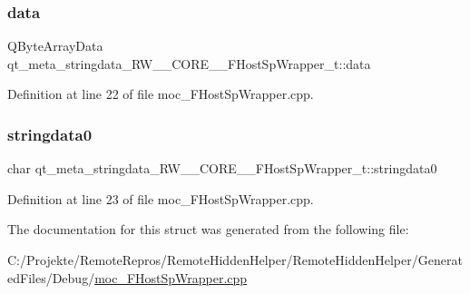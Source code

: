\subsubsection{\texorpdfstring{data}{data}}
{\footnotesize\ttfamily Q\+Byte\+Array\+Data qt\+\_\+meta\+\_\+stringdata\+\_\+\+R\+W\+\_\+\+\_\+\+C\+O\+R\+E\+\_\+\+\_\+\+F\+Host\+Sp\+Wrapper\+\_\+t\+::data}



Definition at line 22 of file moc\+\_\+\+F\+Host\+Sp\+Wrapper.\+cpp.

\hypertarget{structqt__meta__stringdata___r_w_____c_o_r_e_____f_host_sp_wrapper__t_a9d1313b4195bca5e48e5fba152725df4}{}\label{structqt__meta__stringdata___r_w_____c_o_r_e_____f_host_sp_wrapper__t_a9d1313b4195bca5e48e5fba152725df4} 
\subsubsection{\texorpdfstring{stringdata0}{stringdata0}}
{\footnotesize\ttfamily char qt\+\_\+meta\+\_\+stringdata\+\_\+\+R\+W\+\_\+\+\_\+\+C\+O\+R\+E\+\_\+\+\_\+\+F\+Host\+Sp\+Wrapper\+\_\+t\+::stringdata0}



Definition at line 23 of file moc\+\_\+\+F\+Host\+Sp\+Wrapper.\+cpp.



The documentation for this struct was generated from the following file\+:\begin{DoxyCompactItemize}
\item 
C\+:/\+Projekte/\+Remote\+Repros/\+Remote\+Hidden\+Helper/\+Remote\+Hidden\+Helper/\+Generated\+Files/\+Debug/\hyperlink{_debug_2moc___f_host_sp_wrapper_8cpp}{moc\+\_\+\+F\+Host\+Sp\+Wrapper.\+cpp}\end{DoxyCompactItemize}
